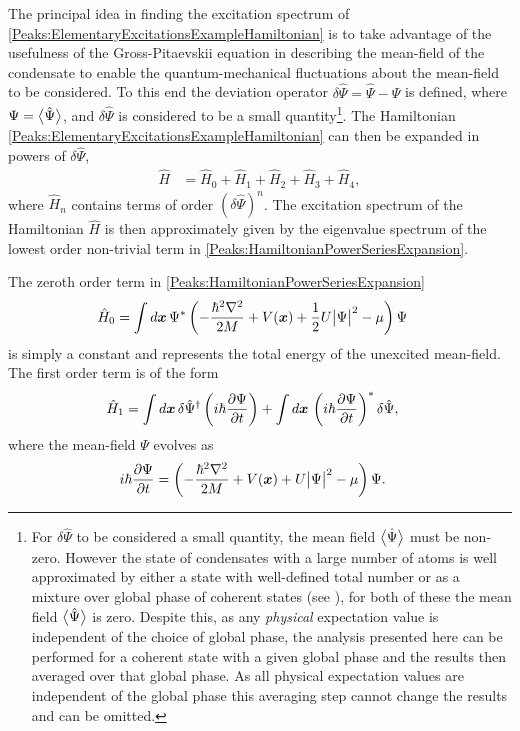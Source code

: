 The principal idea in finding the excitation spectrum of \eqref{Peaks:ElementaryExcitationsExampleHamiltonian} is to take advantage of the usefulness of the Gross-Pitaevskii equation in describing the mean-field of the condensate to enable the quantum-mechanical fluctuations about the mean-field to be considered. To this end the deviation operator $\delta \hat{\Psi} = \hat{\Psi} - \Psi$ is defined, where $\Psi = {\big<\hat{\Psi}\big>}$, and $\delta \hat{\Psi}$ is considered to be a small quantity\footnote{For $\delta\hat{\Psi}$ to be considered a small quantity, the mean field ${\big<\hat{\Psi}\big>}$ must be non-zero. However the state of condensates with a large number of atoms is well approximated by either a state with well-defined total number or as a mixture over global phase of coherent states (see ), for both of these the mean field ${\big<\hat{\Psi}\big>}$ is zero. Despite this, as any \emph{physical} expectation value is independent of the choice of global phase, the analysis presented here can be performed for a coherent state with a given global phase and the results then averaged over that global phase. As all physical expectation values are independent of the global phase this averaging step cannot change the results and can be omitted.}. The Hamiltonian \eqref{Peaks:ElementaryExcitationsExampleHamiltonian} can then be expanded in powers of $\delta \hat{\Psi}$,
\begin{align}
    \label{Peaks:HamiltonianPowerSeriesExpansion}
    \hat{H} &= \hat{H}_0 + \hat{H}_1 + \hat{H}_2 + \hat{H}_3 + \hat{H}_4,
\end{align}
where $\hat{H}_n$ contains terms of order $(\delta\hat{\Psi})^n$. The excitation spectrum of the Hamiltonian $\hat{H}$ is then approximately given by the eigenvalue spectrum of the lowest order non-trivial term in \eqref{Peaks:HamiltonianPowerSeriesExpansion}.

The zeroth order term in \eqref{Peaks:HamiltonianPowerSeriesExpansion}
\begin{align}
    \hat{H}_0 &= \int d \bm{x}\, \Psi^* \left( -\frac{\hbar^2 \nabla^2}{2M} + V(\bm{x}) + \frac{1}{2} U \big|\Psi\big|^2 - \mu \right) \Psi
\end{align}
is simply a constant and represents the total energy of the unexcited mean-field. The first order term is of the form
\begin{align}
    \hat{H}_1 &= \int d \bm{x}\, \delta \hat{\Psi}^\dagger \left(i \hbar \frac{\partial \Psi}{\partial t} \right)  + \int d \bm{x}\, \left(i \hbar \frac{\partial \Psi}{\partial t} \right)^* \delta \hat{\Psi},
\end{align}
where the mean-field $\Psi$ evolves as
\begin{align}
    i \hbar \frac{\partial\Psi}{\partial t} &= \left(-\frac{\hbar^2 \nabla^2}{2 M} + V(\bm{x}) + U \big| \Psi\big|^2 - \mu \right) \Psi.
\end{align}


